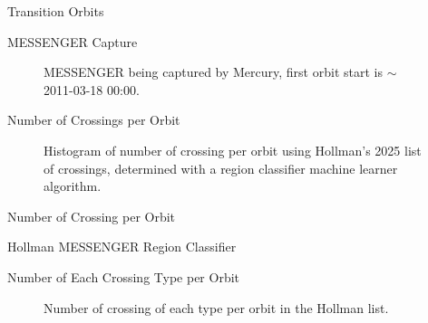 \documentclass[./presentation_main.tex]{subfiles}
\begin{document}
\begin{frame}[c]{Transition Orbits}
\begin{figure}[H]
    \centering
    
    \label{figtransitionorbits}
\end{figure}
%
\end{frame}
\begin{frame}[c]{MESSENGER Capture}
\begin{figure}[H]
    \centering
    
    \captionsetup{font=scriptsize}
    \caption{\scriptsize MESSENGER being captured by Mercury, first orbit start is $\sim$ 2011-03-18 00:00.}
    \label{figorbitcapture}
\end{figure}
%
\end{frame}
\begin{frame}[c]{Number of Crossings per Orbit}
\pause
\vspace{-10pt}
\begin{figure}[H]
    \centering
    
    \captionsetup{font=scriptsize}
    \caption{Histogram of number of crossing per orbit using Hollman's 2025 list of crossings, determined with a region classifier machine learner algorithm.}
    \label{fighollmancrossings}
\end{figure}
%
\end{frame}
\begin{frame}[c]{Number of Crossing per Orbit}
\begin{figure}[H]
    \centering
    
    \label{figloghollman}
\end{figure}
%
\end{frame}
\begin{frame}[c]{Hollman MESSENGER Region Classifier}
\begin{figure}[H]
    \centering
    
    \caption{}
    \label{fighollmanmodel}
\end{figure}
%
\end{frame}
\begin{frame}[c]{Number of Each Crossing Type per Orbit}
\begin{figure}[H]
    \centering
    
    \caption{\scriptsize Number of crossing of each type per orbit in the Hollman list.}
    \label{fignumberofcrossingtype}
\end{figure}
%
\end{frame}
\end{document}

